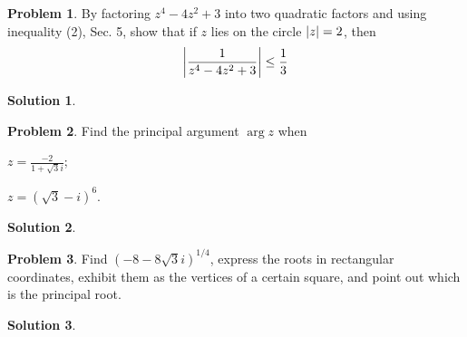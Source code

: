 \documentclass[10pt]{article}
\theoremstyle{definition}
\newtheorem{problem}{Problem}
\newtheorem{soln}{Solution}
\begin{document}
\begin{problem}
By factoring $z^4 - 4z^2 + 3$ into two quadratic factors and using inequality (2), Sec. 5,
show that if $z$ lies on the circle $\abs{z} = 2$, then
$$\abs{\frac{1}{z^4-4z^2+3}}\leq \frac{1}{3}$$
\end{problem}
\begin{soln}
\end{soln}

\begin{problem}
Find the principal argument $\arg{z}$ when
  \begin{enumerate*}[label=(\alph*)]
    \item $\displaystyle z=\frac{-2}{1+\sqrt{3}i}$;\qquad~
    \item $\displaystyle z=\left(\sqrt{3}-i\right)^6$.
  \end{enumerate*}
\end{problem}
\begin{soln}
\end{soln}

\begin{problem}
Find $\left(-8-8\sqrt{3}i\right)^{1/4}$, express the roots in rectangular coordinates, 
exhibit them as the vertices of a certain square, and point out which is the principal root.
\end{problem}
\begin{soln}
\end{soln}
\end{document}
